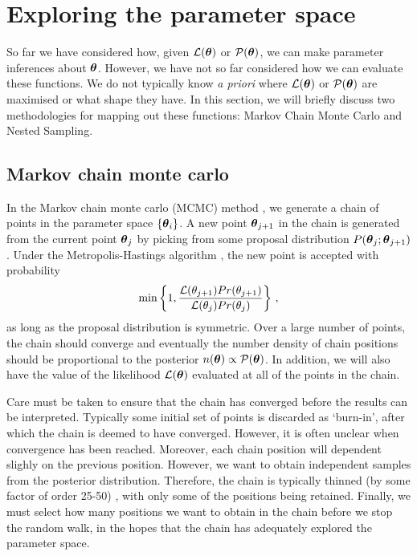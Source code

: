 \section{Exploring the parameter space}

So far we have considered how, given $\mathcal{L}(\boldsymbol\theta)$ or $\mathcal{P}(\boldsymbol\theta)$, we can make parameter inferences about $\boldsymbol\theta$. However, we have not so far considered how we can evaluate these functions. We do not typically know \textit{a priori} where $\mathcal{L}(\boldsymbol\theta)$ or $\mathcal{P}(\boldsymbol\theta)$ are maximised or what shape they have. In this section, we will briefly discuss two methodologies for mapping out these functions: Markov Chain Monte Carlo and Nested Sampling.

\subsection{Markov chain monte carlo}


In the Markov chain monte carlo (MCMC) method \cite{Lewis:2009} , we generate a chain of points in the parameter space $\left\{\boldsymbol\theta_i\right\}$. A new point $\boldsymbol\theta_{j+1}$ in the chain is generated from the current point $\boldsymbol\theta_{j}$ by picking from some proposal distribution $P(\boldsymbol\theta_{j}; \boldsymbol\theta_{j+1})$. Under the Metropolis-Hastings algorithm \cite{Metropolis:1953}, the new point is accepted with probability
\begin{equation}
\textrm{min}\left\{1, \frac{\mathcal{L}(\bold\theta_{j+1})Pr(\bold\theta_{j+1})}{\mathcal{L}(\bold\theta_{j})Pr(\bold\theta_{j})} \right\}\,,
\end{equation}
as long as the proposal distribution is symmetric. Over a large number of points, the chain should converge and eventually the number density of chain positions should be proportional to the posterior \(n(\boldsymbol\theta) \propto \mathcal{P}(\boldsymbol\theta)\). In addition, we will also have the value of the likelihood $\mathcal{L}(\boldsymbol\theta)$ evaluated at all of the points in the chain.

Care must be taken to ensure that the chain has converged before the results can be interpreted. Typically some initial set of points is discarded as `burn-in', after which the chain is deemed to have converged. However, it is often unclear when convergence has been reached. Moreover, each chain position will dependent slighly on the previous position. However, we want to obtain independent samples from the posterior distribution. Therefore, the chain is typically thinned (by some factor of order 25-50) \cite{Lewis:2002}, with only some of the positions being retained. Finally, we must select how many positions we want to obtain in the chain before we stop the random walk, in the hopes that the chain has adequately explored the parameter space. 

